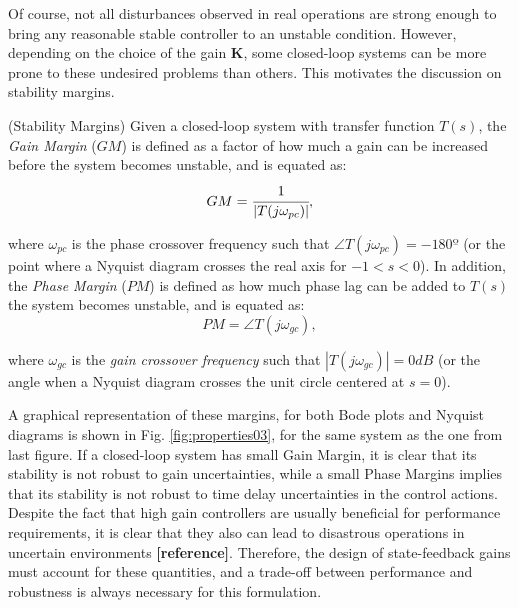 \documentclass[a4paper,11pt]{book}
\numberwithin{figure}{chapter}
\numberwithin{equation}{chapter}
\numberwithin{table}{chapter}
\theoremstyle{definition}
\newtheorem{definition}{Definition}[chapter]
\newcounter{boxed-theorem}
\newcounter{boxed-definition}
\newenvironment{boxed-definition}[1]
{\begin{shaded} \begin{definition}{#1}}
{\end{definition} \end{shaded}}
\begin{document}
Of course, not all disturbances observed in real operations are strong enough to bring any reasonable stable controller to an unstable condition. However, depending on the choice of the gain $\bm{K}$, some closed-loop systems can be more prone to these undesired problems than others. This motivates the discussion on stability margins.

\begin{boxed-definition}{(Stability Margins)}
    Given a closed-loop system with transfer function $T(s)$, the \textit{Gain Margin} ($GM$) is defined as a factor of how much a gain can be increased before the system becomes unstable, and is equated as:
    \begin{equation}
        GM = \cfrac{1}{|T(j \omega_{pc})|}
    ,\end{equation}
    
    \noindent where $\omega_{pc}$ is the phase crossover frequency such that $\angle T(j\omega_{pc}) = -180º$ (or the point where a Nyquist diagram crosses the real axis for $-1 < s < 0$). In addition, the \textit{Phase Margin} ($PM$) is defined as how much phase lag can be added to $T(s)$ the system becomes unstable, and is equated as:
    \begin{equation}
        PM = \angle T(j \omega_{gc})
    ,\end{equation}
    
    \noindent where $\omega_{gc}$ is the \textit{gain crossover frequency} such that $| T(j\omega_{gc}) | = 0 dB$ (or the angle when a Nyquist diagram crosses the unit circle centered at $s = 0$). 
\end{boxed-definition}

A graphical representation of these margins, for both Bode plots and Nyquist diagrams is shown in Fig. \ref{fig:properties03}, for the same system as the one from last figure. If a closed-loop system has small Gain Margin, it is clear that its stability is not robust to gain uncertainties, while a small Phase Margins implies that its stability is not robust to time delay uncertainties in the control actions. Despite the fact that high gain controllers are usually beneficial for performance requirements, it is clear that they also can lead to disastrous operations in uncertain environments \textbf{[reference]}. Therefore, the design of state-feedback gains must account for these quantities, and a trade-off between performance and robustness is always necessary for this formulation. 
\end{document}
